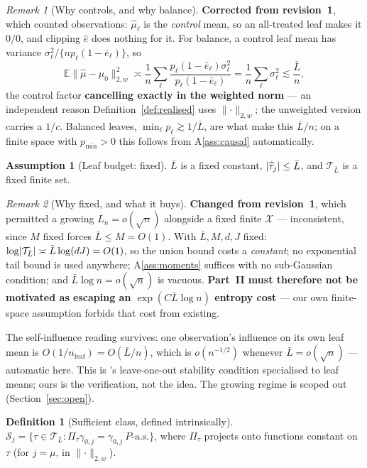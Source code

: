 \documentclass[11pt]{article}
\theoremstyle{plain}
\theoremstyle{definition}
\newtheorem{assumption}{Assumption}
\newtheorem{definition}{Definition}
\theoremstyle{remark}
\newtheorem{remark}{Remark}
\newcommand{\E}{\mathbb{E}}
\newcommand{\cX}{\mathcal{X}}
\newcommand{\cT}{\mathcal{T}}
\newcommand{\cS}{\mathcal{S}}
\newcommand{\mz}{\mu_0}
\newcommand{\ehat}{\widehat{e}}
\newcommand{\mhat}{\widehat{\mu}}
\newcommand{\that}{\widehat{\tau}}
\newcommand{\Lw}[1]{\lVert #1 \rVert_{2,w}}
\DeclarePairedDelimiter{\card}{\lvert}{\rvert}
\begin{document}
\begin{remark}[Why controls, and why balance]\label{rem:mass}
\textbf{Corrected from revision~1}, which counted observations: $\mhat_\ell$ is
the \emph{control} mean, so an all-treated leaf makes it $0/0$, and clipping
$\ehat$ does nothing for it. For balance, a control leaf mean has variance
$\sigma^2_\ell/\{np_\ell(1-\bar e_\ell)\}$, so
\[
 \E\Lw{\mhat-\mz}^2\asymp\frac1n\sum_\ell
   \frac{p_\ell(1-\bar e_\ell)\sigma^2_\ell}{p_\ell(1-\bar e_\ell)}
  =\frac1n\sum_\ell\sigma^2_\ell\lesssim\frac{\bar L}n,
\]
the control factor \textbf{cancelling exactly in the weighted norm} --- an
independent reason Definition~\ref{def:realised} uses $\Lw\cdot$; the unweighted
version carries a $1/c$. Balanced leaves, $\min_\ell p_\ell\gtrsim1/\bar L$, are
what make this $\bar L/n$; on a finite space with $p_{\min}>0$ this follows from
A\ref{ass:causal} automatically.
\end{remark}

\begin{assumption}[Leaf budget: fixed]\label{ass:budget}
$\bar L$ is a fixed constant, $\card{\that_j}\le\bar L$, and $\cT_{\bar L}$ is a
fixed finite set.
\end{assumption}

\begin{remark}[Why fixed, and what it buys]\label{rem:fixed-tier}
\textbf{Changed from revision~1}, which permitted a growing $L_n=o(\sqrt n)$
alongside a fixed finite $\cX$ --- inconsistent, since $M$ fixed forces
$\bar L\le M=O(1)$. With $\bar L,M,d,J$ fixed:
$\log\card{\cT_{\bar L}}\asymp\bar L\log(dJ)=O(1)$, so the union bound costs a
\emph{constant}; no exponential tail bound is used anywhere; A\ref{ass:moments}
suffices with no sub-Gaussian condition; and $\bar L\log n=o(\sqrt n)$ is vacuous.
\textbf{Part~II must therefore not be motivated as escaping an
$\exp(C\bar L\log n)$ entropy cost} --- our own finite-space assumption forbids
that cost from existing.

The self-influence reading survives: one observation's influence on its own leaf
mean is $O(1/n_{\mathrm{leaf}})=O(\bar L/n)$, which is $o(n^{-1/2})$ whenever
$\bar L=o(\sqrt n)$ --- automatic here. This is \citet{chen2022}'s leave-one-out
stability condition specialised to leaf means; ours is the verification, not the
idea. The growing regime is scoped out (Section~\ref{sec:open}).
\end{remark}

\begin{definition}[Sufficient class, defined intrinsically]\label{def:sufficient}
$\cS_j=\{\tau\in\cT_{\bar L}:\Pi_\tau\gamma_{0,j}=\gamma_{0,j}\ P\text{-a.s.}\}$,
where $\Pi_\tau$ projects onto functions constant on $\tau$ (for $j=\mu$, in
$\Lw\cdot$).
\end{definition}
\end{document}

